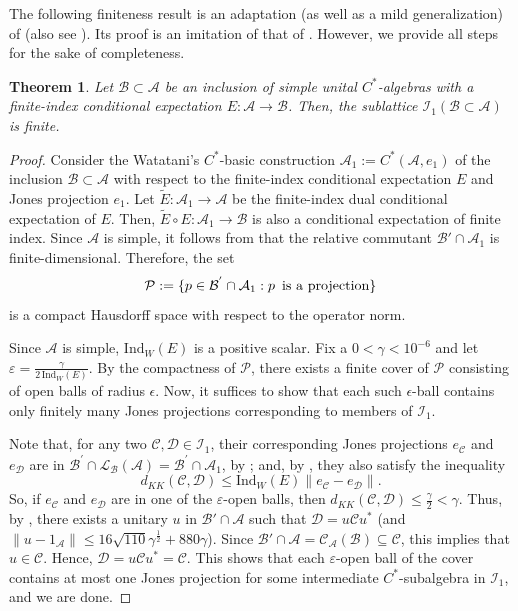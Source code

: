 \documentclass{amsart}
\numberwithin{equation}{section}
\newcommand{\Ind}{\mathrm{Ind}}
\newcommand{\mcal}{\mathcal}
\newcommand{\1}{\mathbf{1}}
\newcommand{\mA}{\mathcal{A}}
\newcommand{\mB}{\mathcal{B}}
\newcommand{\mC}{\mathcal{C}}
\newcommand{\mD}{\mathcal{D}}
\newtheorem{theorem}{Theorem}[section]
\begin{document}
The following finiteness result is an adaptation (as well as a mild
generalization) of \cite[Corollary 3.9]{IW} (also see \cite[Theorem
  1.3]{KM}). Its proof is an imitation  of that of
. However, we provide all steps for the sake of
completeness.

\begin{theorem}\label{L1-finite}
Let $\mB \subset \mA $ be an inclusion of simple unital $C^{*}$-algebras
with a finite-index conditional expectation $E : \mA \rightarrow
\mB$. Then, the sublattice $\mcal{I}_1(\mB \subset \mA)$  is finite.
\end{theorem}

\begin{proof}
 Consider the Watatani's $C^*$-basic construction $\mA_1:= C^*(\mA,
  e_1)$ of the inclusion $\mB \subset \mA$ with respect to the
 finite-index conditional expectation $E$ and Jones projection
 $e_1$. Let $ \widetilde{E} : \mA_1 \rightarrow \mA$ be the
 finite-index dual conditional expectation of $E$. Then,
 $\widetilde{E} \circ {E} : \mA_1 \rightarrow \mB $ is also a
 conditional expectation of finite index. Since $\mA$ is simple, it
 follows from \cite[Proposition 2.7.3]{Wat} that the relative
 commutant $\mB'\cap \mA_1$ is finite-dimensional.  Therefore, the set
\[
\mathcal{P}:=\{p\in \mB^{'}\cap \mA_1 :   p \mbox{\, is a projection}\}   
\]
is a compact Hausdorff space with respect to the operator norm.

Since $\mA$ is simple, $\Ind_W(E)$ is a positive scalar. Fix a $0 <
\gamma < 10^{-6}$ and let $\varepsilon = \frac{\gamma}{2\,
  \mathrm{Ind}_W(E)}$. By the compactness of $\mcal{P}$, there
exists a finite cover of $\mcal{P}$ consisting of open balls of radius
$\epsilon$.  Now, it suffices to show that each such $\epsilon$-ball
contains only finitely many Jones projections corresponding to members
of $\mathcal{I}_{1}$.

Note that, for any two $\mC,\mD \in \mathcal{I}_{1}$, their
corresponding Jones projections $e_{\mC}$ and $e_{\mD}$ are in $
\mB^{'}\cap \mcal{L}_{\mB}(\mA)= \mB^{'}\cap \mA_{1}$, by
; and, by , they also satisfy the
inequality
$$
d_{KK}(\mC,\mD)\leq \mathrm{Ind}_W(E) \|e_{\mC}-e_{\mD}\|.
$$ 
So, if $e_{\mC}$ and $e_{\mD}$ are in one of the
$\varepsilon$-open balls, then $d_{KK}(\mC,\mD)\leq \frac{\gamma}{2}<
\gamma$. Thus, by \cite[Theorem 3.7]{Dickson}, there exists a unitary
$u$ in $\mB'\cap \mA$ such that $\mD= u\mC u^{*}$ (and $\|u-
1_{\mA}\|\leq 16\sqrt{110}\gamma^{\frac{1}{2}}+ 880 \gamma$). Since
$\mB'\cap \mA = \mC_{\mA}(\mB) \subseteq \mC$, this implies that $u\in
\mC$. Hence, $\mD=u\mC u^{*}= \mC$. This shows that each
$\varepsilon$-open ball of the cover contains at most one Jones
projection for some intermediate $C^{*}$-subalgebra in
$\mathcal{I}_{1}$, and we are done.
\end{proof}
\end{document}
